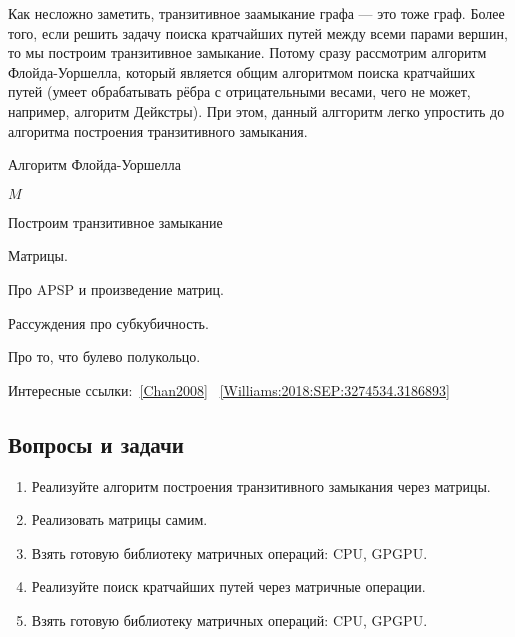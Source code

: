 Как несложно заметить, транзитивное заамыкание графа --- это тоже граф.
Более того, если решить задачу поиска кратчайших путей между всеми парами вершин, то мы построим транзитивное замыкание.
Потому сразу рассмотрим алгоритм Флойда-Уоршелла, который является общим алгоритмом поиска кратчайших путей (умеет обрабатывать рёбра с отрицательными весами, чего не может, например, алгоритм Дейкстры).
При этом, данный алггоритм легко упростить до алгоритма построения транзитивного замыкания.

\begin{algorithm}
\begin{algorithmic}[1]
\caption{Алгоритм Флойда-Уоршелла}
\label{lst:algoFloydWarxhall}
        \EndFor
      \EndFor
    \EndFor
\State \Return $M$
\EndFunction
\end{algorithmic}
\end{algorithm}


\begin{example}
  Построим транзитивное замыкание 
\end{example}



Матрицы.

Про APSP и произведение матриц.

Рассуждения про субкубичность.

Про то, что булево полукольцо.

Интересные ссылки:~\ref{Chan2008} ~\ref{Williams:2018:SEP:3274534.3186893}

\subsection{Вопросы и задачи}
\begin{enumerate}
  \item Реализуйте алгоритм построения транзитивного замыкания через матрицы.
  \item Реализовать матрицы самим.
  \item Взять готовую библиотеку матричных операций: CPU, GPGPU.
  \item Реализуйте поиск кратчайших путей через матричные операции.
  \item Взять готовую библиотеку матричных операций: CPU, GPGPU.
\end{enumerate}
